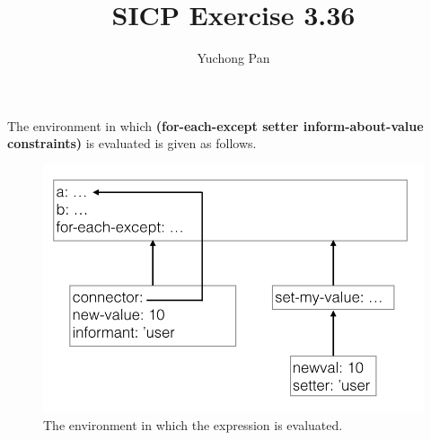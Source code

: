 \documentclass[11pt, oneside]{article}
\title{SICP Exercise 3.36}
\author{Yuchong Pan}
\begin{document}
\maketitle

The environment in which \textbf{(for-each-except setter inform-about-value constraints)} is evaluated is given as follows.

\begin{figure}[h!]
    \centering\includegraphics[width=15cm]{ex-3.36.png}
    \caption{The environment in which the expression is evaluated.}
\end{figure}
\end{document}
